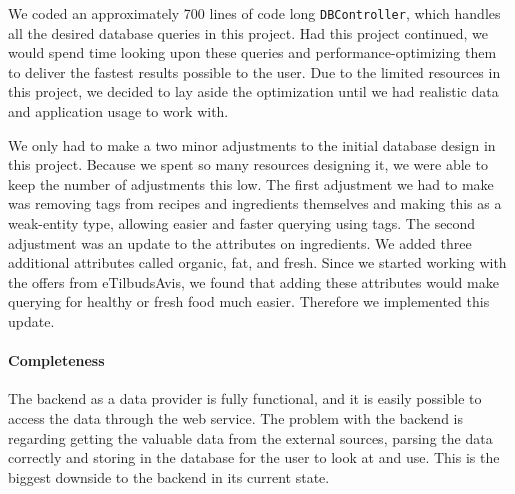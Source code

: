 We coded an approximately 700 lines of code long \texttt{DBController}, which handles all the desired database queries in this project. Had this project continued, we would spend time looking upon these queries and performance-optimizing them to deliver the fastest results possible to the user. Due to the limited resources in this project, we decided to lay aside the optimization until we had realistic data and application usage to work with. 

We only had to make a two minor adjustments to the initial database design in this project. Because we spent so many resources designing it, we were able to keep the number of adjustments this low. The first adjustment we had to make was removing tags from recipes and ingredients themselves and making this as a weak-entity type, allowing easier and faster querying using tags. The second adjustment was an update to the attributes on ingredients. We added three additional attributes called organic, fat, and fresh. Since we started working with the offers from eTilbudsAvis\cite{etilbudsavis}, we found that adding these attributes would make querying for healthy or fresh food much easier. Therefore we implemented this update.

\paragraph{Completeness}
The backend as a data provider is fully functional, and it is easily possible to access the data through the web service. The problem with the backend is regarding getting the valuable data from the external sources, parsing the data correctly and storing in the database for the user to look at and use. This is the biggest downside to the backend in its current state.